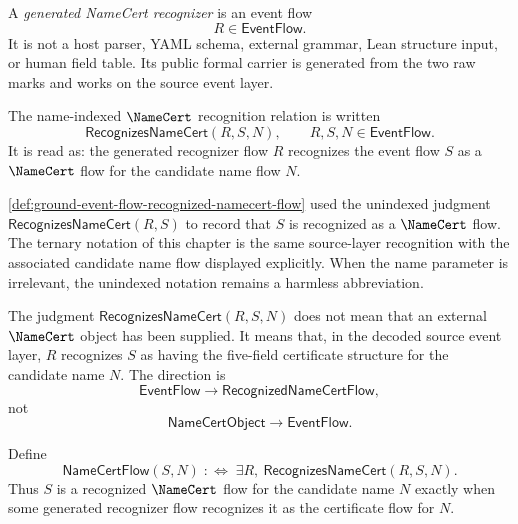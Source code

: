 \begin{definition}
\label{def:namecert-generated-recognizer}
A \emph{generated NameCert recognizer} is an event flow
$$
  R \in \mathsf{EventFlow}.
$$
It is not a host parser, YAML schema, external grammar, Lean structure input, or human field table. Its public formal carrier is generated from the two raw marks and works on the source event layer.
\end{definition}

\begin{definition}
\label{def:namecert-generated-recognition-relation}
The name-indexed $\NameCert$ recognition relation is written
$$
  \mathsf{RecognizesNameCert}(R,S,N),
  \qquad
  R,S,N \in \mathsf{EventFlow}.
$$
It is read as: the generated recognizer flow $R$ recognizes the event flow $S$ as a $\NameCert$ flow for the candidate name flow $N$.
\end{definition}

\begin{remark}
\label{rem:namecert-generated-relation-to-unindexed-judgment}
\autoref{def:ground-event-flow-recognized-namecert-flow} used the unindexed judgment $\mathsf{RecognizesNameCert}(R,S)$ to record that $S$ is recognized as a $\NameCert$ flow. The ternary notation of this chapter is the same source-layer recognition with the associated candidate name flow displayed explicitly. When the name parameter is irrelevant, the unindexed notation remains a harmless abbreviation.
\end{remark}

\begin{remark}
\label{rem:namecert-generated-recognition-not-input}
The judgment $\mathsf{RecognizesNameCert}(R,S,N)$ does not mean that an external $\NameCert$ object has been supplied. It means that, in the decoded source event layer, $R$ recognizes $S$ as having the five-field certificate structure for the candidate name $N$. The direction is
$$
  \mathsf{EventFlow}
  \longrightarrow
  \mathsf{RecognizedNameCertFlow},
$$
not
$$
  \mathsf{NameCertObject}
  \longrightarrow
  \mathsf{EventFlow}.
$$
\end{remark}

\begin{definition}
\label{def:namecert-generated-recognized-namecert-flow}
Define
$$
  \mathsf{NameCertFlow}(S,N)
  \;:\Longleftrightarrow\;
  \exists R,\ \mathsf{RecognizesNameCert}(R,S,N).
$$
Thus $S$ is a recognized $\NameCert$ flow for the candidate name $N$ exactly when some generated recognizer flow recognizes it as the certificate flow for $N$.
\end{definition}

